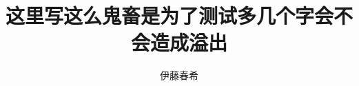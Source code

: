 \documentclass[master,oneside]{zjuthesis} %
\title{这里写这么鬼畜是为了测试多几个字会不会造成溢出} %
\author{伊藤春希}          %
\institute{软件学院}         %
\begin{document}
\maketitle

\abstractmatter



\frontmatter
\tableofcontents %
\listoffigures   %
\listoftables    %
%

\mainmatter




\backmatter



%




\end{document}
